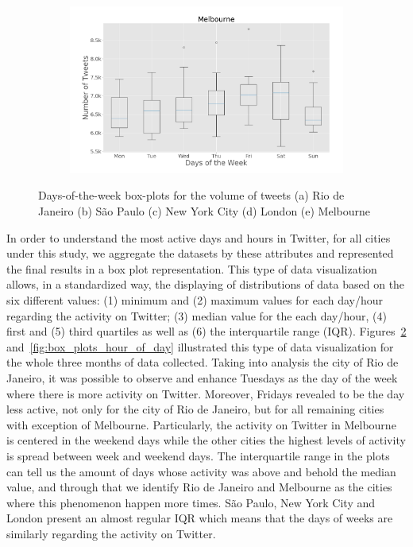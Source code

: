 \begin{figure}[htbp]
     \begin{subfigure}[htbp]{0.45\textwidth}
        \centering
        \includegraphics[width=1\linewidth]{figures/melbourne_box_plt_day_of_week.png}
        \caption{}
        \label{subfig:melbourne_box_plot_day_of_week}
    \end{subfigure}
    
\caption[Days-of-the-week box-plots for the volume of tweets]{Days-of-the-week box-plots for the volume of tweets (a) Rio de Janeiro (b) São Paulo (c) New York City (d) London (e) Melbourne}
\label{fig:box_plots_day_of_week}
\end{figure}

In order to understand the most active days and hours in Twitter, for all cities under this study, we aggregate the datasets by these attributes and represented the final results in a box plot representation. This type of data visualization allows, in a standardized way, the displaying of distributions of data based on the six different values: (1) minimum and (2) maximum values for each day/hour regarding the activity on Twitter; (3) median value for the each day/hour, (4) first and (5) third quartiles as well as (6) the interquartile range (IQR). Figures~\ref{fig:box_plots_day_of_week} and~\ref{fig:box_plots_hour_of_day} illustrated this type of data visualization for the whole three months of data collected. Taking into analysis the city of Rio de Janeiro, it was possible to observe and enhance Tuesdays as the day of the week where there is more activity on Twitter. Moreover, Fridays revealed to be the day less active, not only for the city of Rio de Janeiro, but for all remaining cities with exception of Melbourne. Particularly, the activity on Twitter in Melbourne is centered in the weekend days while the other cities the highest levels of activity is spread between week and weekend days. The interquartile range in the plots can tell us the amount of days whose activity was above and behold the median value, and through that we identify Rio de Janeiro and Melbourne as the cities where this phenomenon happen more times. São Paulo, New York City and London present an almost regular IQR which means that the days of weeks are similarly regarding the activity on Twitter.

